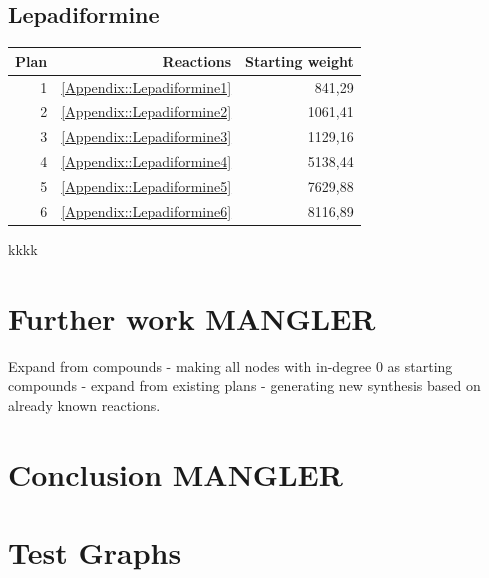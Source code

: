 \documentclass[a4paper,10pt,titlepage]{paper}
\begin{document}
\subsection{Lepadiformine}
\begin{table}[H]
\centering
\begin{tabular}{|r|r|r|}
\hline
Plan & Reactions & Starting weight \\ \hline
1 & \ref{Appendix::Lepadiformine1} & 841,29 \\\hline
2 & \ref{Appendix::Lepadiformine2} & 1061,41 \\\hline
3 & \ref{Appendix::Lepadiformine3} & 1129,16 \\\hline
4 & \ref{Appendix::Lepadiformine4} & 5138,44 \\\hline
5 & \ref{Appendix::Lepadiformine5} & 7629,88 \\\hline
6 & \ref{Appendix::Lepadiformine6} & 8116,89 \\\hline
\end{tabular}
\end{table}

kkkk \cite{SynthesisPlans}\\

\section{Further work MANGLER}
Expand from compounds - making all nodes with in-degree 0 as starting compounds - expand from existing plans - generating new synthesis based on already known reactions.
\section{Conclusion MANGLER}

\newpage

\printbibliography[type=book, title={Books}]
\printbibliography[type=article, title={Articles}]
\printbibliography[nottype=book, nottype=article, title={Other}]

\newpage
\appendix
{}
\section{Test Graphs}
\end{document}
